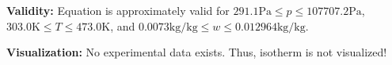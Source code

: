 \textbf{Validity:}
\newline
Equation is approximately valid for $291.1 \si{\pascal} \leq p \leq 107707.2 \si{\pascal}$,  $303.0 \si{\kelvin} \leq T \leq 473.0 \si{\kelvin}$, and $0.0073 \si{\kilogram\per\kilogram} \leq w \leq 0.012964 \si{\kilogram\per\kilogram}$.
\newline

\textbf{Visualization:}
%
\newline
No experimental data exists. Thus, isotherm is not visualized!
%

\FloatBarrier
\newpage
